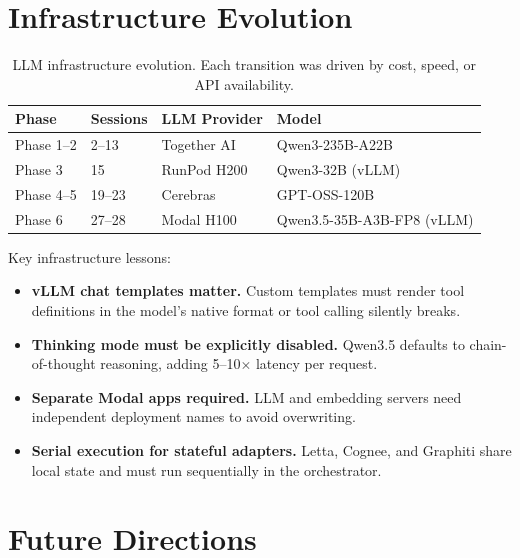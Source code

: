 \documentclass[11pt,letterpaper]{article}
\begin{document}
\section{Infrastructure Evolution}
\label{sec:infra}

\begin{table}[H]
\centering
\small
\begin{tabular}{llll}
\toprule
\textbf{Phase} & \textbf{Sessions} & \textbf{LLM Provider} & \textbf{Model} \\
\midrule
Phase 1--2 & 2--13 & Together AI & Qwen3-235B-A22B \\
Phase 3 & 15 & RunPod H200 & Qwen3-32B (vLLM) \\
Phase 4--5 & 19--23 & Cerebras & GPT-OSS-120B \\
Phase 6 & 27--28 & Modal H100 & Qwen3.5-35B-A3B-FP8 (vLLM) \\
\bottomrule
\end{tabular}
\caption{LLM infrastructure evolution. Each transition was driven by cost, speed, or API availability.}
\label{tab:infra}
\end{table}

Key infrastructure lessons:
\begin{itemize}[nosep]
  \item \textbf{vLLM chat templates matter.} Custom templates must render tool definitions in the model's native format or tool calling silently breaks.
  \item \textbf{Thinking mode must be explicitly disabled.} Qwen3.5 defaults to chain-of-thought reasoning, adding 5--10$\times$ latency per request.
  \item \textbf{Separate Modal apps required.} LLM and embedding servers need independent deployment names to avoid overwriting.
  \item \textbf{Serial execution for stateful adapters.} Letta, Cognee, and Graphiti share local state and must run sequentially in the orchestrator.
\end{itemize}

\section{Future Directions}
\label{sec:future}
\end{document}
